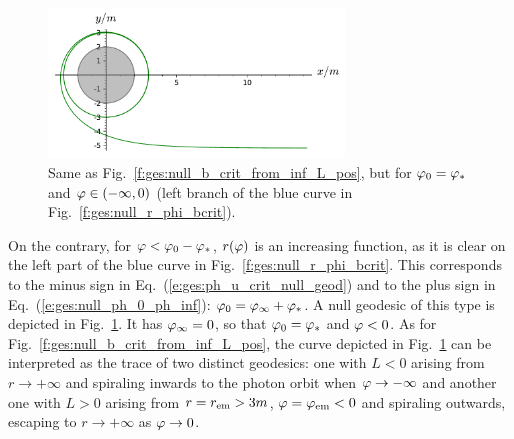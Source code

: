 \begin{figure}
\centerline{\includegraphics[width=0.7\textwidth]{ges_null_b_crit_from_inf_L_neg.pdf}}
\caption[]{\label{f:ges:null_b_crit_from_inf_L_neg} \footnotesize
Same as Fig.~\ref{f:ges:null_b_crit_from_inf_L_pos}, but for $\varphi_0 = \varphi_*$
and $\varphi\in(-\infty,0)$ (left branch of the blue curve in Fig.~\ref{f:ges:null_r_phi_bcrit}).}
\end{figure}

On the contrary, for $\varphi < \varphi_0 - \varphi_*$,
$r(\varphi)$ is an increasing
function, as it is clear on the left part of the blue curve in Fig.~\ref{f:ges:null_r_phi_bcrit}.
This corresponds to the
minus sign in Eq.~(\ref{e:ges:ph_u_crit_null_geod}) and to the plus sign in
Eq.~(\ref{e:ges:null_ph_0_ph_inf}): $\varphi_0 = \varphi_\infty + \varphi_*$.
A null geodesic of this type is depicted in Fig.~\ref{f:ges:null_b_crit_from_inf_L_neg}.
It has $\varphi_\infty = 0$, so that $\varphi_0 = \varphi_*$ and $\varphi < 0$.
As for Fig.~\ref{f:ges:null_b_crit_from_inf_L_pos}, the curve depicted in
Fig.~\ref{f:ges:null_b_crit_from_inf_L_neg} can be interpreted as the trace of two distinct
geodesics: one with $L<0$ arising from $r\to + \infty$
and spiraling inwards to the photon orbit when $\varphi\to -\infty$
and another one with $L>0$
arising from $r=r_{\rm em} > 3 m$, $\varphi=\varphi_{\rm em}<0$
and spiraling outwards, escaping to $r\to +\infty$ as $\varphi\to 0$.

